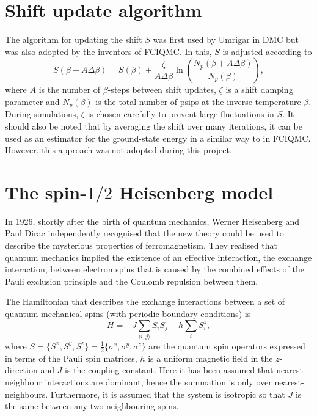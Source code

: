 \section{Shift update algorithm}
The algorithm for updating the shift $S$ was first used by Umrigar\cite{Umrigar1993} in DMC but was also adopted by the inventors of FCIQMC\cite{Booth2009}. In this, $S$ is adjusted according to
\begin{equation}
S(\beta + A\Delta\beta) = S(\beta) + \frac{\zeta}{A\Delta\beta}\ln\left( \frac{N_p(\beta + A\Delta\beta)}{N_p(\beta)}\right),
\end{equation}
where $A$ is the number of $\beta$-steps between shift updates, $\zeta$ is a shift damping parameter and $N_p(\beta)$ is the total number of psips at the inverse-temperature $\beta$. During simulations, $\zeta$ is chosen carefully to prevent large fluctuations in $S$. It should also be noted that by averaging the shift over many iterations, it can be used as an estimator for the ground-state energy in a similar way to in FCIQMC. However, this approach was not adopted during this project.

\section{The spin-$1/2$ Heisenberg model}
\label{sec:Heisenberg}
In 1926, shortly after the birth of quantum mechanics, Werner Heisenberg\cite{Heisenberg1926} and Paul Dirac\cite{Dirac1926} independently recognised that the new theory could be used to describe the mysterious properties of ferromagnetism. They realised that quantum mechanics implied the existence of an effective interaction, the exchange interaction, between electron spins that is caused by the combined effects of the Pauli exclusion principle and the Coulomb repulsion between them\cite{Karbach1998}.

The Hamiltonian that describes the  exchange interactions between a set of quantum mechanical spins (with periodic boundary conditions) is
\begin{equation}
\label{eq:HeisenbergHamiltonian}
H = -J\sum_{\langle i, j \rangle} S_{i} S_{j} +h\sum_{i}S^z_i,
\end{equation}
where $S = \{S^x,S^y,S^z\} = \frac{1}{2}\{\sigma^x,\sigma^y,\sigma^z\}$ are the quantum spin operators expressed in terms of the Pauli spin matrices, $h$ is a uniform magnetic field in the $z$-direction and $J$ is the coupling constant. Here it has been assumed that nearest-neighbour interactions are dominant, hence the summation is only over nearest-neighbours. Furthermore, it is assumed that the system is isotropic so that $J$ is the same between any two neighbouring spins. 

